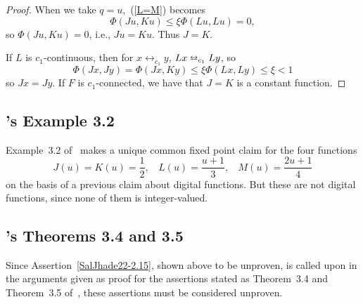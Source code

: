 \documentclass{article}
\newtheorem{prop}[thm]{Proposition}
\numberwithin{thm}{section}
\newcommand{\adj}{\leftrightarrow}
\newcommand{\adjeq}{\leftrightarroweq}
\begin{document}
\begin{proof}
When we take $q=u$,~(\ref{L=M}) becomes
\[ \Phi(Ju,Ku) \le \xi \Phi(Lu,Lu) = 0,
\]
so $\Phi(Ju,Ku)=0$,
i.e., $Ju=Ku$. Thus $J=K$.

If $L$ is $c_1$-continuous, then
for $x \adj_{c_1} y$, $Lx \adjeq_{c_1} Ly$,
so
\[ \Phi(Jx,Jy) = \Phi(Jx,Ky)
\le
\xi \Phi(Lx,Ly) \le \xi
< 1
\]
so $Jx=Jy$. If
$F$ is $c_1$-connected,
we have that $J=K$ is a
constant function.
\end{proof}

\subsection{\cite{SalJhade22}'s
Example 3.2}
Example~3.2 of~\cite{SalJhade22}
makes a unique common fixed point
claim for the four functions
\[ J(u)=K(u)=\frac{1}{2},~~~~L(u)= \frac{u+1}{3},~~~~
M(u)=\frac{2u+1}{4}
\]
on the basis of a
previous claim about
digital functions.
But these are not digital
functions, since none of them is
integer-valued.

\subsection{\cite{SalJhade22}'s Theorems 3.4 and 3.5}
Since Assertion~\ref{SalJhade22-2.15}, shown above to be unproven,
is called upon in the arguments
given as proof for the assertions
stated as Theorem~3.4 and 
Theorem~3.5 of~\cite{SalJhade22},
these assertions must be considered
unproven. %
\end{document}
